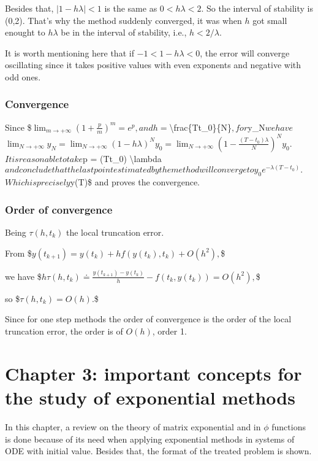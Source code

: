 \documentclass[letterpaper,10pt,english]{jupyterBook}
\begin{document}
\sphinxAtStartPar
Besides that, \(|1 - h \lambda| < 1\) is the same as \(0 < h \lambda < 2\).
So the interval of stability is (0,2).
That’s why the method suddenly converged, it was when \(h\) got small enought to \(h \lambda\) be in the interval of stability, i.e., \(h < 2/\lambda\).

\sphinxAtStartPar
It is worth mentioning here that if \(-1 < 1 - h \lambda < 0\), the error will converge oscillating since it takes positive values with even exponents and negative with odd ones.


\subsubsection{Convergence}
\label{\detokenize{cap2:convergence}}
\sphinxAtStartPar
Since
\$\(
\lim_{m \to +\infty} \left(1 + \frac{p}{m} \right)^m = e^p,
\)\(
and h = \)\textbackslash{}frac\{T\sphinxhyphen{}t\_0\}\{N\}\(, for \)y\_N\( we have
\)\(
\lim_{N \to +\infty} y_N = \lim_{N \to +\infty} \left(1 - h \lambda \right)^N y_0 = \lim_{N \to +\infty} \left(1 - \frac{(T-t_0) \lambda}{N} \right)^N y_0.
\)\(
It is reasonable to take \)p = \sphinxhyphen{}(T\sphinxhyphen{}t\_0) \textbackslash{}lambda\( and conclude that the last point estimated by the method will converge to
\)\(
y_0e^{-\lambda (T-t_0)}.
\)\(
Which is precisely \)y(T)\$ and proves the convergence.


\subsubsection{Order of convergence}
\label{\detokenize{cap2:order-of-convergence}}
\sphinxAtStartPar
Being \(\tau(h, t_k)\) the local truncation error.

\sphinxAtStartPar
From
\$\(
    y(t_{k+1}) = y(t_k) + h f(y(t_k),t_k) + O(h^2),
\)\$

\sphinxAtStartPar
we have
\$\(
    h \tau(h, t_k) \doteq \frac{y(t_{k+1}) - y(t_k)}{h} - f(t_k, y(t_k)) = O(h^2),
\)\$

\sphinxAtStartPar
so
\$\(
    \tau(h, t_k) = O(h).
\)\$

\sphinxAtStartPar
Since for one step methods the order of convergence is the order of the local truncation error, the order is of \(O(h)\), order 1.

\sphinxstepscope


\section{Chapter 3: important concepts for the study of exponential methods}
\label{\detokenize{cap3:chapter-3-important-concepts-for-the-study-of-exponential-methods}}\label{\detokenize{cap3::doc}}
\sphinxAtStartPar
In this chapter, a review on the theory of matrix exponential and in \(\phi\) functions is done because of its need when applying exponential methods in systems of ODE with initial value. Besides that, the format of the treated problem is shown.
\end{document}

